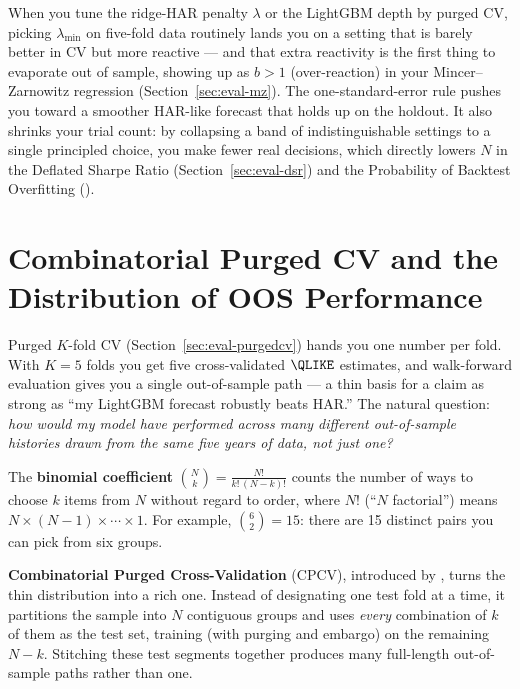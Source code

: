 \begin{projectconnection}
When you tune the ridge-HAR penalty $\lambda$ or the LightGBM depth by purged CV, picking $\lambda_{\min}$ on five-fold data routinely lands you on a setting that is barely better in CV but more reactive --- and that extra reactivity is the first thing to evaporate out of sample, showing up as $b > 1$ (over-reaction) in your Mincer--Zarnowitz regression (Section~\ref{sec:eval-mz}).
The one-standard-error rule pushes you toward a smoother HAR-like forecast that holds up on the holdout.
It also shrinks your trial count: by collapsing a band of indistinguishable settings to a single principled choice, you make fewer real decisions, which directly lowers $N$ in the Deflated Sharpe Ratio (Section~\ref{sec:eval-dsr}) and the Probability of Backtest Overfitting ().
\end{projectconnection}


\section{Combinatorial Purged CV and the Distribution of OOS Performance}
\label{sec:ch16:cpcv}

Purged $K$-fold CV (Section~\ref{sec:eval-purgedcv}) hands you one number per fold.
With $K = 5$ folds you get five cross-validated $\QLIKE$ estimates, and walk-forward evaluation gives you a single out-of-sample path --- a thin basis for a claim as strong as ``my LightGBM forecast robustly beats HAR.''
The natural question: \emph{how would my model have performed across many different out-of-sample histories drawn from the same five years of data, not just one?}

\begin{prereq}
The \textbf{binomial coefficient} $\binom{N}{k} = \frac{N!}{k!\,(N-k)!}$ counts the number of ways to choose $k$ items from $N$ without regard to order, where $N!$ (``$N$ factorial'') means $N \times (N-1) \times \cdots \times 1$.
For example, $\binom{6}{2} = 15$: there are 15 distinct pairs you can pick from six groups.
\end{prereq}

\textbf{Combinatorial Purged Cross-Validation} (CPCV), introduced by \citet{LopezdePrado2018}, turns the thin distribution into a rich one.
Instead of designating one test fold at a time, it partitions the sample into $N$ contiguous groups and uses \emph{every} combination of $k$ of them as the test set, training (with purging and embargo) on the remaining $N-k$.
Stitching these test segments together produces many full-length out-of-sample paths rather than one.

